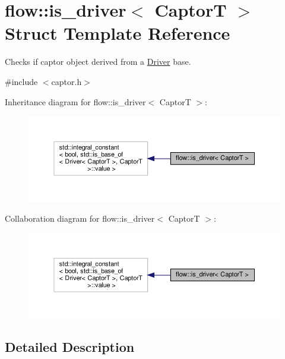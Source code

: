 \hypertarget{structflow_1_1is__driver}{}\section{flow\+:\+:is\+\_\+driver$<$ CaptorT $>$ Struct Template Reference}
\label{structflow_1_1is__driver}


Checks if captor object derived from a \hyperlink{classflow_1_1_driver}{Driver} base.  




{\ttfamily \#include $<$captor.\+h$>$}



Inheritance diagram for flow\+:\+:is\+\_\+driver$<$ CaptorT $>$\+:\nopagebreak
\begin{figure}[H]
\begin{center}
\leavevmode
\includegraphics[width=350pt]{structflow_1_1is__driver__inherit__graph}
\end{center}
\end{figure}


Collaboration diagram for flow\+:\+:is\+\_\+driver$<$ CaptorT $>$\+:\nopagebreak
\begin{figure}[H]
\begin{center}
\leavevmode
\includegraphics[width=350pt]{structflow_1_1is__driver__coll__graph}
\end{center}
\end{figure}


\subsection{Detailed Description}
